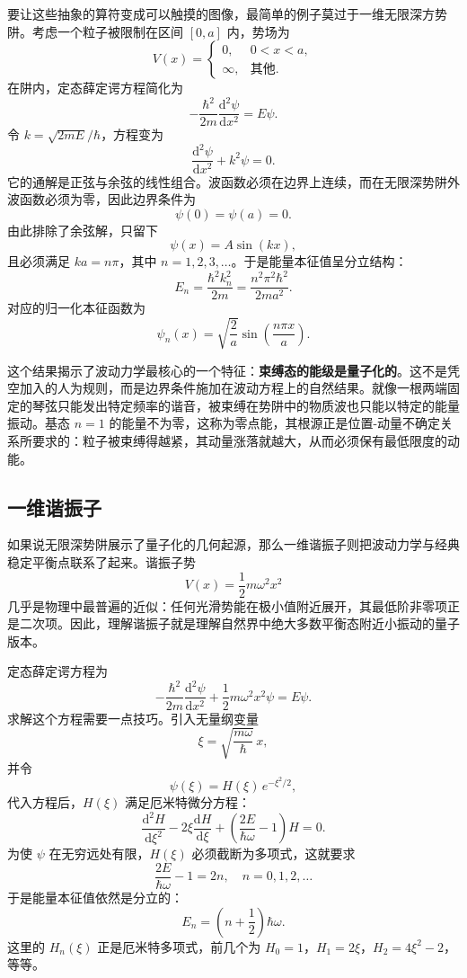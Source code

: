 \documentclass[UTF8]{ctexbook}
\begin{document}
要让这些抽象的算符变成可以触摸的图像，最简单的例子莫过于一维无限深方势阱。考虑一个粒子被限制在区间 $[0, a]$ 内，势场为
\[
V(x) = \begin{cases}
0, & 0 < x < a,\\
\infty, & \text{其他}.
\end{cases}
\]
在阱内，定态薛定谔方程简化为
\[
-\frac{\hbar^2}{2m} \frac{\mathrm{d}^2 \psi}{\mathrm{d}x^2} = E \psi.
\]
令 $k = \sqrt{2mE}/\hbar$，方程变为
\[
\frac{\mathrm{d}^2 \psi}{\mathrm{d}x^2} + k^2 \psi = 0.
\]
它的通解是正弦与余弦的线性组合。波函数必须在边界上连续，而在无限深势阱外波函数必须为零，因此边界条件为
\[
\psi(0) = \psi(a) = 0.
\]
由此排除了余弦解，只留下
\[
\psi(x) = A \sin(kx),
\]
且必须满足 $k a = n\pi$，其中 $n = 1, 2, 3, \ldots$。于是能量本征值呈分立结构：
\[
E_n = \frac{\hbar^2 k_n^2}{2m} = \frac{n^2 \pi^2 \hbar^2}{2ma^2}.
\]
对应的归一化本征函数为
\[
\psi_n(x) = \sqrt{\frac{2}{a}} \sin\left(\frac{n\pi x}{a}\right).
\]

这个结果揭示了波动力学最核心的一个特征：\textbf{束缚态的能级是量子化的}。这不是凭空加入的人为规则，而是边界条件施加在波动方程上的自然结果。就像一根两端固定的琴弦只能发出特定频率的谐音，被束缚在势阱中的物质波也只能以特定的能量振动。基态 $n=1$ 的能量不为零，这称为零点能，其根源正是位置-动量不确定关系所要求的：粒子被束缚得越紧，其动量涨落就越大，从而必须保有最低限度的动能。

\subsection{一维谐振子}

如果说无限深势阱展示了量子化的几何起源，那么一维谐振子则把波动力学与经典稳定平衡点联系了起来。谐振子势
\[
V(x) = \frac{1}{2} m \omega^2 x^2
\]
几乎是物理中最普遍的近似：任何光滑势能在极小值附近展开，其最低阶非零项正是二次项。因此，理解谐振子就是理解自然界中绝大多数平衡态附近小振动的量子版本。

定态薛定谔方程为
\[
-\frac{\hbar^2}{2m} \frac{\mathrm{d}^2 \psi}{\mathrm{d}x^2} + \frac{1}{2} m \omega^2 x^2 \psi = E \psi.
\]
求解这个方程需要一点技巧。引入无量纲变量
\[
\xi = \sqrt{\frac{m\omega}{\hbar}} \, x,
\]
并令
\[
\psi(\xi) = H(\xi) \, e^{-\xi^2/2},
\]
代入方程后，$H(\xi)$ 满足厄米特微分方程：
\[
\frac{\mathrm{d}^2 H}{\mathrm{d}\xi^2} - 2\xi \frac{\mathrm{d}H}{\mathrm{d}\xi} + \left( \frac{2E}{\hbar\omega} - 1 \right) H = 0.
\]
为使 $\psi$ 在无穷远处有限，$H(\xi)$ 必须截断为多项式，这就要求
\[
\frac{2E}{\hbar\omega} - 1 = 2n, \quad n = 0, 1, 2, \ldots
\]
于是能量本征值依然是分立的：
\[
E_n = \left( n + \frac{1}{2} \right) \hbar \omega.
\]
这里的 $H_n(\xi)$ 正是厄米特多项式，前几个为 $H_0 = 1$，$H_1 = 2\xi$，$H_2 = 4\xi^2 - 2$，等等。
\end{document}
